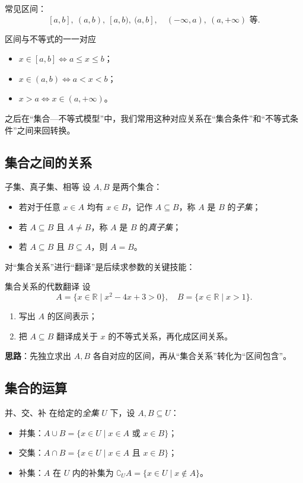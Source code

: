 \documentclass[a4paper,11pt]{ctexart}
\begin{document}
常见区间：
\[
[a,b],\ (a,b),\ [a,b),\ (a,b],\quad (-\infty,a),\ (a,+\infty) \text{ 等}.
\]

\begin{notebox}{区间与不等式的一一对应}
\begin{itemize}
  \item $x\in[a,b]\iff a\le x\le b$；
  \item $x\in(a,b)\iff a<x<b$；
  \item $x>a\iff x\in(a,+\infty)$。
\end{itemize}
之后在“集合—不等式模型”中，我们常用这种对应关系在“集合条件”和“不等式条件”之间来回转换。
\end{notebox}

\subsection{集合之间的关系}

\begin{definitionbox}{子集、真子集、相等}
设 $A,B$ 是两个集合：
\begin{itemize}
  \item 若对于任意 $x\in A$ 均有 $x\in B$，记作 $A\subseteq B$，称 $A$ 是 $B$ 的\emph{子集}；
  \item 若 $A\subseteq B$ 且 $A\ne B$，称 $A$ 是 $B$ 的\emph{真子集}；
  \item 若 $A\subseteq B$ 且 $B\subseteq A$，则 $A=B$。
\end{itemize}
\end{definitionbox}

对“集合关系”进行“翻译”是后续求参数的关键技能：

\begin{examplebox}{集合关系的代数翻译}
设
\[
A=\{x\in\mathbb{R}\mid x^2-4x+3>0\},\quad
B=\{x\in\mathbb{R}\mid x>1\}.
\]
\begin{enumerate}
  \item 写出 $A$ 的区间表示；
  \item 把 $A\subseteq B$ 翻译成关于 $x$ 的不等式关系，再化成区间关系。
\end{enumerate}
\textbf{思路}：先独立求出 $A,B$ 各自对应的区间，再从“集合关系”转化为“区间包含”。
\end{examplebox}

\subsection{集合的运算}

\begin{definitionbox}{并、交、补}
在给定的\emph{全集} $U$ 下，设 $A,B\subseteq U$：
\begin{itemize}
  \item 并集：$A\cup B=\{x\in U\mid x\in A\text{ 或 }x\in B\}$；
  \item 交集：$A\cap B=\{x\in U\mid x\in A\text{ 且 }x\in B\}$；
  \item 补集：$A$ 在 $U$ 内的补集为 $\complement_U A=\{x\in U\mid x\notin A\}$。
\end{itemize}
\end{definitionbox}
\end{document}
